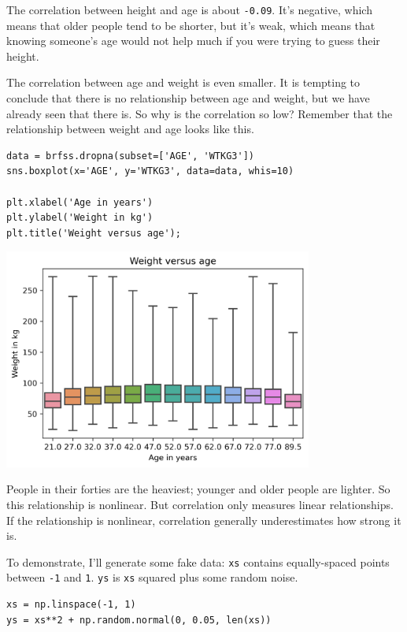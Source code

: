 The correlation between height and age is about
\passthrough{\lstinline!-0.09!}. It's negative, which means that older
people tend to be shorter, but it's weak, which means that knowing
someone's age would not help much if you were trying to guess their
height.

The correlation between age and weight is even smaller. It is tempting
to conclude that there is no relationship between age and weight, but we
have already seen that there is. So why is the correlation so low?
Remember that the relationship between weight and age looks like this.

\begin{lstlisting}[]
data = brfss.dropna(subset=['AGE', 'WTKG3'])
sns.boxplot(x='AGE', y='WTKG3', data=data, whis=10)

plt.xlabel('Age in years')
plt.ylabel('Weight in kg')
plt.title('Weight versus age');
\end{lstlisting}

\begin{center}
\includegraphics[width=4in]{09_relationships_files/09_relationships_58_0.png}
\end{center}

People in their forties are the heaviest; younger and older people are
lighter. So this relationship is nonlinear. But correlation only
measures linear relationships. If the relationship is nonlinear,
correlation generally underestimates how strong it is.

To demonstrate, I'll generate some fake data:
\passthrough{\lstinline!xs!} contains equally-spaced points between
\passthrough{\lstinline!-1!} and \passthrough{\lstinline!1!}.
\passthrough{\lstinline!ys!} is \passthrough{\lstinline!xs!} squared
plus some random noise.

\begin{lstlisting}[]
xs = np.linspace(-1, 1)
ys = xs**2 + np.random.normal(0, 0.05, len(xs))
\end{lstlisting}

